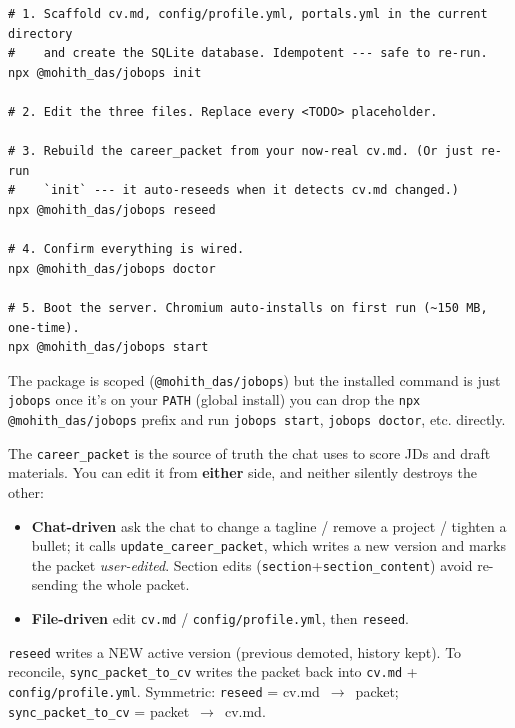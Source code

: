 \documentclass[11pt,letterpaper]{article}
\newcommand{\tool}[1]{\texttt{#1}}
\newcommand{\fpath}[1]{\texttt{#1}}
\newcommand{\cmd}[1]{\texttt{#1}}
\begin{document}
\begin{lstlisting}[language=bashplus]
# 1. Scaffold cv.md, config/profile.yml, portals.yml in the current directory
#    and create the SQLite database. Idempotent --- safe to re-run.
npx @mohith_das/jobops init

# 2. Edit the three files. Replace every <TODO> placeholder.

# 3. Rebuild the career_packet from your now-real cv.md. (Or just re-run
#    `init` --- it auto-reseeds when it detects cv.md changed.)
npx @mohith_das/jobops reseed

# 4. Confirm everything is wired.
npx @mohith_das/jobops doctor

# 5. Boot the server. Chromium auto-installs on first run (~150 MB, one-time).
npx @mohith_das/jobops start
\end{lstlisting}

\begin{tipbox}
The package is scoped (\cmd{@mohith\_das/jobops}) but the installed command is just \cmd{jobops} \textemdash{} once it's on your \texttt{PATH} (global install) you can drop the \cmd{npx @mohith\_das/jobops} prefix and run \cmd{jobops start}, \cmd{jobops doctor}, etc. directly.
\end{tipbox}

\begin{tipbox}
The \tool{career\_packet} is the source of truth the chat uses to score JDs and draft
materials. You can edit it from \textbf{either} side, and neither silently destroys the other:
\begin{itemize}
\item \textbf{Chat-driven} \textemdash{} ask the chat to change a tagline / remove a project / tighten a bullet; it calls \tool{update\_career\_packet}, which writes a new version and marks the packet \emph{user-edited}. Section edits (\texttt{section}+\texttt{section\_content}) avoid re-sending the whole packet.
\item \textbf{File-driven} \textemdash{} edit \fpath{cv.md} / \fpath{config/profile.yml}, then \cmd{reseed}.
\end{itemize}
\cmd{reseed} writes a NEW active version (previous demoted, history kept). To reconcile, \tool{sync\_packet\_to\_cv} writes the packet back into \fpath{cv.md} + \fpath{config/profile.yml}. Symmetric: \cmd{reseed} = cv.md~$\rightarrow$~packet; \tool{sync\_packet\_to\_cv} = packet~$\rightarrow$~cv.md.
\end{tipbox}
\end{document}

